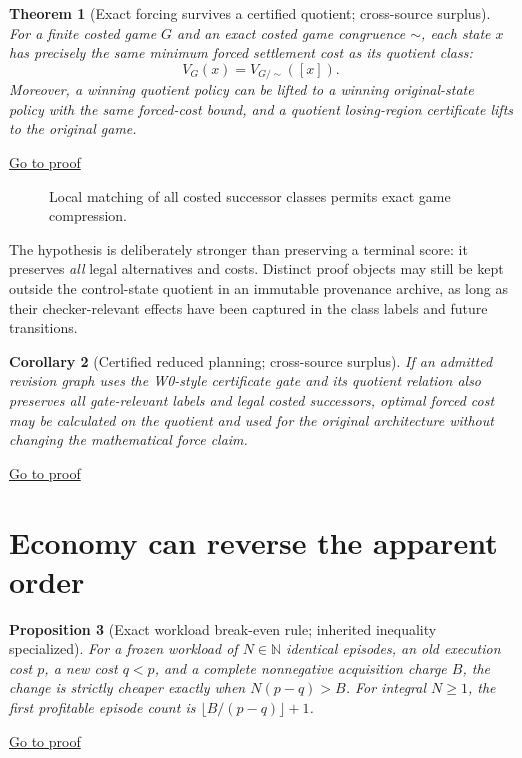 \documentclass[11pt,letterpaper]{article}
\newtheorem{theorem}{Theorem}[section]
\newtheorem{proposition}[theorem]{Proposition}
\newtheorem{corollary}[theorem]{Corollary}
\theoremstyle{definition}
\theoremstyle{remark}
\newcommand{\N}{\mathbb{N}}
\newcommand{\backproof}[1]{\hfill\hyperlink{proof:#1}{\footnotesize Go to proof}}
\begin{document}
\begin{theorem}[Exact forcing survives a certified quotient; cross-source surplus]\label{thm:quot}\hypertarget{stmt:quot}{}
For a finite costed game $G$ and an exact costed game congruence $\sim$, each state $x$ has precisely the same minimum forced settlement cost as its quotient class:
\[
\boxed{V_G(x)=V_{G/\sim}([x]).}
\]
Moreover, a winning quotient policy can be lifted to a winning original-state policy with the same forced-cost bound, and a quotient losing-region certificate lifts to the original game.
\end{theorem}\backproof{quot}

\begin{figure}[ht]
\centering{}
\caption{Local matching of all costed successor classes permits exact game compression.}
\end{figure}

The hypothesis is deliberately stronger than preserving a terminal score: it preserves \emph{all} legal alternatives and costs. Distinct proof objects may still be kept outside the control-state quotient in an immutable provenance archive, as long as their checker-relevant effects have been captured in the class labels and future transitions.

\begin{corollary}[Certified reduced planning; cross-source surplus]\label{cor:gate}\hypertarget{stmt:gate}{}
If an admitted revision graph uses the W0-style certificate gate and its quotient relation also preserves all gate-relevant labels and legal costed successors, optimal forced cost may be calculated on the quotient and used for the original architecture without changing the mathematical force claim.
\end{corollary}\backproof{gate}

\section{Economy can reverse the apparent order}
\begin{proposition}[Exact workload break-even rule; inherited inequality specialized]\label{prop:break}\hypertarget{stmt:break}{}
For a frozen workload of $N\in\N$ identical episodes, an old execution cost $p$, a new cost $q<p$, and a complete nonnegative acquisition charge $B$, the change is strictly cheaper exactly when $N(p-q)>B$. For integral $N\ge1$, the first profitable episode count is $\lfloor B/(p-q)\rfloor+1$.
\end{proposition}\backproof{break}
\end{document}
